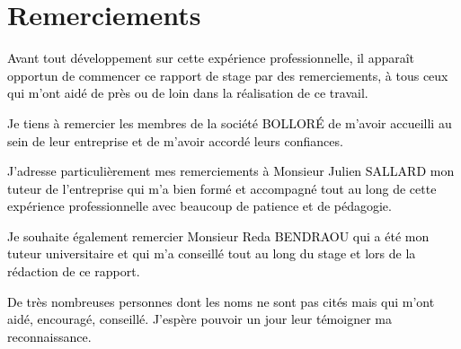 \chapter*{Remerciements}


\textcolor{black}{Avant tout développement sur cette expérience professionnelle, il apparaît opportun de commencer ce rapport de stage par des remerciements, à tous ceux qui m’ont aidé de près ou de loin dans la réalisation de ce travail.}

\textcolor{black}{Je tiens à remercier les membres de la société BOLLORÉ de m’avoir accueilli au sein de leur entreprise et de m’avoir accordé leurs confiances.}

\textcolor{black}{J’adresse particulièrement mes remerciements à Monsieur Julien SALLARD mon tuteur de l’entreprise qui m’a bien formé et accompagné tout au long de cette expérience professionnelle avec beaucoup de patience et de pédagogie.}

\textcolor{black}{Je souhaite également remercier Monsieur Reda BENDRAOU qui a été mon tuteur universitaire et qui m’a conseillé tout au long du stage et lors de la rédaction de ce rapport.}

\textcolor{black}{De très nombreuses personnes dont les noms ne sont pas cités mais qui m’ont aidé, encouragé, conseillé. J’espère pouvoir un jour leur témoigner ma reconnaissance.}
